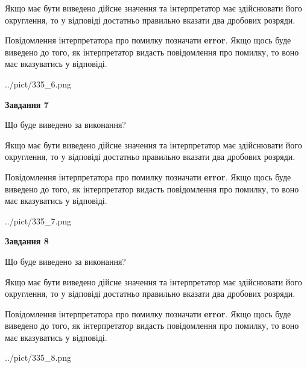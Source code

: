 \documentclass[12pt, ukrainian]{article}
\begin{document}
{\begin {Large}
Якщо має бути виведено дійсне значення та інтерпретатор має здійснювати його округлення, 
то у відповіді достатньо правильно вказати два дробових розряди.

Повідомлення інтерпретатора про помилку позначати \textbf{error}.
Якщо щось буде виведено до того, як інтерпретатор видасть повідомлення про помилку, 
то воно має вказуватись у відповіді. \par

\begin{center}
	{../pict/335_6.png}
\end{center}
\newpage

{\begin {center}\textbf{Завдання 7}\end {center}}\par
Що буде виведено за виконання? \par

Якщо має бути виведено дійсне значення та інтерпретатор має здійснювати його округлення, 
то у відповіді достатньо правильно вказати два дробових розряди.

Повідомлення інтерпретатора про помилку позначати \textbf{error}.
Якщо щось буде виведено до того, як інтерпретатор видасть повідомлення про помилку, 
то воно має вказуватись у відповіді. \par

\begin{center}
	{../pict/335_7.png}
\end{center}
\newpage

{\begin {center}\textbf{Завдання 8}\end {center}}\par
Що буде виведено за виконання? \par

Якщо має бути виведено дійсне значення та інтерпретатор має здійснювати його округлення, 
то у відповіді достатньо правильно вказати два дробових розряди.

Повідомлення інтерпретатора про помилку позначати \textbf{error}.
Якщо щось буде виведено до того, як інтерпретатор видасть повідомлення про помилку, 
то воно має вказуватись у відповіді. \par

\begin{center}
	{../pict/335_8.png}
\end{center}
\newpage


\end{Large}}
\end{document}
